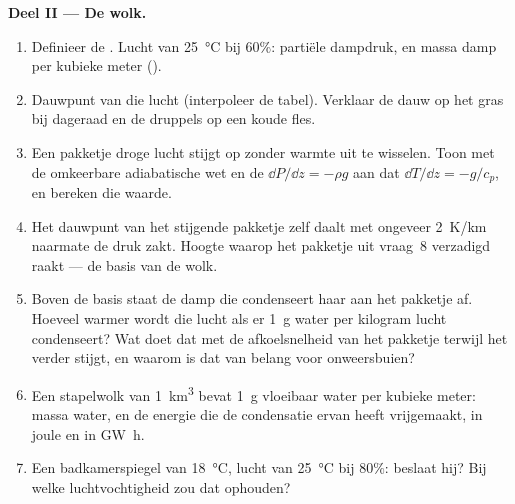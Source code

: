 \begin{problem}
\medskip
\noindent\textbf{Deel II --- De wolk.}
\begin{enumerate}[resume]
  \item Definieer de . Lucht van \qty{25}{\degreeCelsius} bij $60\%$:
        partiële dampdruk, en massa damp per kubieke meter
        ().
  \item Dauwpunt van die lucht (interpoleer de tabel). Verklaar de dauw
        op het gras bij dageraad en de druppels op een koude fles.
  \item Een pakketje droge lucht stijgt op zonder warmte uit te wisselen. Toon met
        de omkeerbare adiabatische wet en de 
        $\dd P/\dd z = -\rho g$ aan dat $\dd T/\dd z = -g/c_p$, en
        bereken die waarde.
  \item Het dauwpunt van het stijgende pakketje zelf daalt met ongeveer
        \qty{2}{K/km} naarmate de druk zakt. Hoogte waarop het pakketje uit
        vraag~8 verzadigd raakt --- de basis van de wolk.
  \item Boven de basis staat de damp die condenseert haar 
        aan het pakketje af. Hoeveel warmer wordt die lucht als er \qty{1}{g}
        water per kilogram lucht condenseert? Wat doet dat met de
        afkoelsnelheid van het pakketje terwijl het verder stijgt, en waarom is dat
        van belang voor onweersbuien?
  \item Een stapelwolk van \qty{1}{km^3} bevat \qty{1}{g} vloeibaar water per kubieke
        meter: massa water, en de energie die de condensatie ervan
        heeft vrijgemaakt, in joule en in \unit{GW h}.
  \item Een badkamerspiegel van \qty{18}{\degreeCelsius}, lucht van
        \qty{25}{\degreeCelsius} bij $80\%$: beslaat hij? Bij welke luchtvochtigheid
        zou dat ophouden?
\end{enumerate}


\end{problem}
